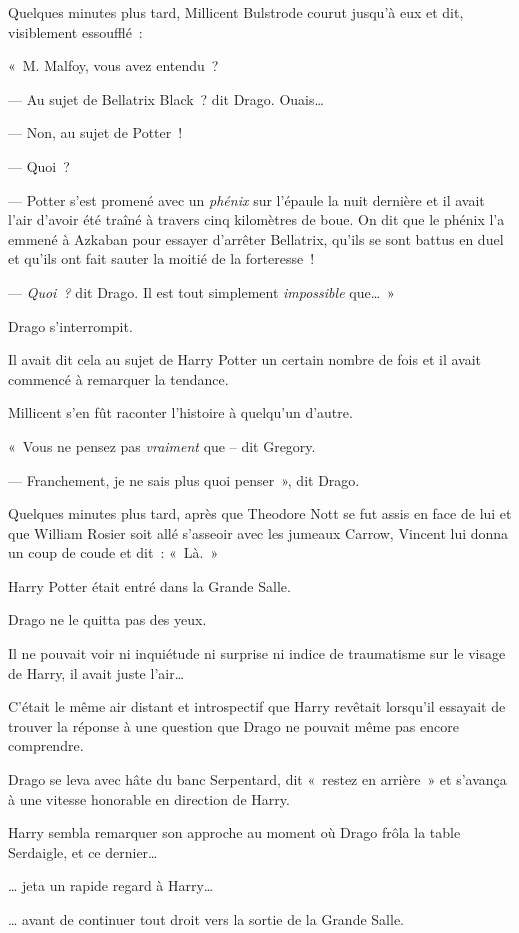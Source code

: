 Quelques minutes plus tard, Millicent Bulstrode courut jusqu'à eux et dit, visiblement essoufflé~:

«~M. Malfoy, vous avez entendu~?

--- Au sujet de Bellatrix Black~? dit Drago. Ouais…

--- Non, au sujet de Potter~!

--- Quoi~?

--- Potter s'est promené avec un \emph{phénix} sur l'épaule la nuit dernière et il avait l'air d'avoir été traîné à travers cinq kilomètres de boue. On dit que le phénix l'a emmené à Azkaban pour essayer d'arrêter Bellatrix, qu'ils se sont battus en duel et qu'ils ont fait sauter la moitié de la forteresse~!

--- \emph{Quoi~?} dit Drago. Il est tout simplement \emph{impossible} que…~»

Drago s'interrompit.

Il avait dit cela au sujet de Harry Potter un certain nombre de fois et il avait commencé à remarquer la tendance.

Millicent s'en fût raconter l'histoire à quelqu'un d'autre.

«~Vous ne pensez pas \emph{vraiment} que -- dit Gregory.

--- Franchement, je ne sais plus quoi penser~», dit Drago.

Quelques minutes plus tard, après que Theodore Nott se fut assis en face de lui et que William Rosier soit allé s'asseoir avec les jumeaux Carrow, Vincent lui donna un coup de coude et dit~: «~Là.~»

Harry Potter était entré dans la Grande Salle.

Drago ne le quitta pas des yeux.

Il ne pouvait voir ni inquiétude ni surprise ni indice de traumatisme sur le visage de Harry, il avait juste l'air…

C'était le même air distant et introspectif que Harry revêtait lorsqu'il essayait de trouver la réponse à une question que Drago ne pouvait même pas encore comprendre.

Drago se leva avec hâte du banc Serpentard, dit «~restez en arrière~» et s'avança à une vitesse honorable en direction de Harry.

Harry sembla remarquer son approche au moment où Drago frôla la table Serdaigle, et ce dernier…

… jeta un rapide regard à Harry…

… avant de continuer tout droit vers la sortie de la Grande Salle.


